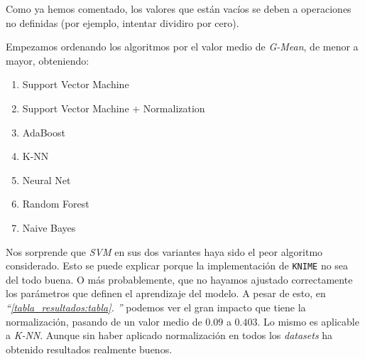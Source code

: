 \documentclass[11pt]{article}
\newcommand{\customcite}[1]{\emph{``\ref{#1}. \nameref{#1}''}}
\begin{document}
\begin{table}[H]
\begin{center}
\end{center}
    \caption{Resumen de los resultados obtenidos con los distintos modelos, en los disntintos \emph{datasets}. Usamos como métrica base \emph{G-Mean}}
    \label{tabla_resultados:tabla}
\end{table}

Como ya hemos comentado, los valores que están vacíos se deben a operaciones no definidas (por ejemplo, intentar dividiro por cero).

Empezamos ordenando los algoritmos por el valor medio de \emph{G-Mean}, de menor a mayor, obteniendo:

\begin{enumerate}
    \item Support Vector Machine
    \item Support Vector Machine + Normalization
    \item AdaBoost
    \item K-NN
    \item Neural Net
    \item Random Forest
    \item Naive Bayes
\end{enumerate}

Nos sorprende que \emph{SVM} en sus dos variantes haya sido el peor algoritmo considerado. Esto se puede explicar porque la implementación de \lstinline{KNIME} no sea del todo buena. O más probablemente, que no hayamos ajustado correctamente los parámetros que definen el aprendizaje del modelo. A pesar de esto, en \customcite{tabla_resultados:tabla} podemos ver el gran impacto que tiene la normalización, pasando de un valor medio de $0.09$ a $0.403$. Lo mismo es aplicable a \emph{K-NN}. Aunque sin haber aplicado normalización en todos los \emph{datasets} ha obtenido resultados realmente buenos.
\end{document}
